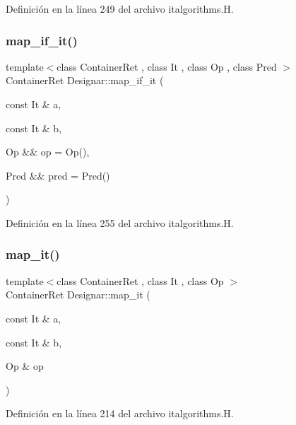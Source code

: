 Definición en la línea 249 del archivo italgorithms.\+H.

\mbox{\label{namespace_designar_ae62503515f0226ac0cc91c94c1176fd5}} 
\subsubsection{\texorpdfstring{map\+\_\+if\+\_\+it()}{map\_if\_it()}\hspace{0.1cm}{\footnotesize\ttfamily [4/4]}}
{\footnotesize\ttfamily template$<$class Container\+Ret , class It , class Op , class Pred $>$ \\
Container\+Ret Designar\+::map\+\_\+if\+\_\+it (\begin{DoxyParamCaption}\item[{const It \&}]{a,  }\item[{const It \&}]{b,  }\item[{Op \&\&}]{op = {\ttfamily Op()},  }\item[{Pred \&\&}]{pred = {\ttfamily Pred()} }\end{DoxyParamCaption})}



Definición en la línea 255 del archivo italgorithms.\+H.

\mbox{\label{namespace_designar_afc87b7b7fbcaed27883b20975ff10e3a}} 
\subsubsection{\texorpdfstring{map\+\_\+it()}{map\_it()}\hspace{0.1cm}{\footnotesize\ttfamily [1/2]}}
{\footnotesize\ttfamily template$<$class Container\+Ret , class It , class Op $>$ \\
Container\+Ret Designar\+::map\+\_\+it (\begin{DoxyParamCaption}\item[{const It \&}]{a,  }\item[{const It \&}]{b,  }\item[{Op \&}]{op }\end{DoxyParamCaption})}



Definición en la línea 214 del archivo italgorithms.\+H.

